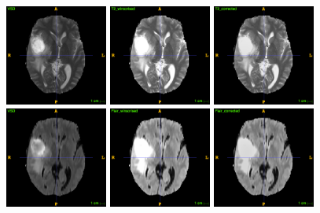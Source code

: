 \documentclass[12pt,a4paper,twoside,openright]{report}
\begin{document}
\begin{figure}
	\vspace{0.5cm}
	\includegraphics[width=0.3\textwidth]{t2_no_norm_example}
	\includegraphics[width=0.3\textwidth]{t2_winsorized_example}
	\includegraphics[width=0.3\textwidth]{t2_n4itk_example} \\
	\vspace{0.5cm}
	\includegraphics[width=0.3\textwidth]{flair_no_norm_example}
	\includegraphics[width=0.3\textwidth]{flair_winsorized_example}
	\includegraphics[width=0.3\textwidth]{flair_n4itk_example}

\end{figure}
\end{document}
